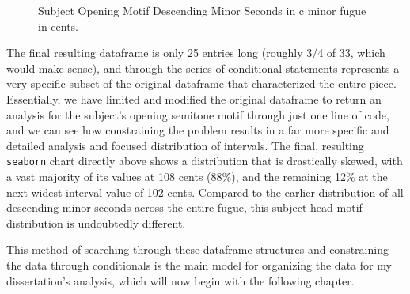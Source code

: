\begin{figure}[H]
    \begin{center}
    \caption{ Subject Opening Motif Descending Minor Seconds in c minor fugue in cents. }
    \end{center}
\end{figure}
    
    The final resulting dataframe is only 25 entries long (roughly 3/4 of
33, which would make sense), and through the series of conditional
statements represents a very specific subset of the original dataframe
that characterized the entire piece. Essentially, we have limited and
modified the original dataframe to return an analysis for the subject's
opening semitone motif through just one line of code, and we can see how
constraining the problem results in a far more specific and detailed
analysis and focused distribution of intervals. The final, resulting
\texttt{seaborn} chart directly above shows a distribution that is
drastically skewed, with a vast majority of its values at 108 cents
(88\%), and the remaining 12\% at the next widest interval value of 102
cents. Compared to the earlier distribution of all descending minor
seconds across the entire fugue, this subject head motif distribution is
undoubtedly different.

This method of searching through these dataframe structures and
constraining the data through conditionals is the main model for
organizing the data for my dissertation's analysis, which will now begin
with the following chapter.


    
    
    
